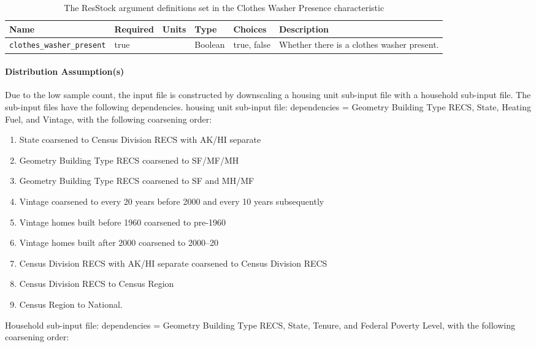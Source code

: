 \begin{longtable}[]{ |p{}|p{1.5cm}|p{1cm}|p{1.1cm}|p{3.4cm}|p{4cm}| }
\caption{The ResStock argument definitions set in the Clothes Washer Presence characteristic}\label{table:hc_arg_def_clothes_washer_presence}\\
\toprule\noalign{}
Name & Required & Units & Type & Choices & Description \\
\midrule\noalign{}
\endhead
\bottomrule\noalign{}
\endlastfoot
\texttt{clothes\_washer\_present} & true & & Boolean & true, false &
Whether there is a clothes washer present. \\
\end{longtable}

\paragraph{Distribution Assumption(s)}
Due to the low sample count, the input file is constructed by downscaling a housing unit sub-input file with a household sub-input file. The sub-input files have the following dependencies. housing unit sub-input file: dependencies = Geometry Building Type RECS, State, Heating Fuel, and Vintage, with the following coarsening order:
\begin{enumerate}
    \item State coarsened to Census Division RECS with AK/HI separate
    \item  Geometry Building Type RECS coarsened to SF/MF/MH
    \item  Geometry Building Type RECS coarsened to SF and MH/MF 
    \item  Vintage coarsened to every 20 years before 2000 and every 10 years subsequently
    \item Vintage homes built before 1960 coarsened to pre-1960 
    \item  Vintage homes built after 2000 coarsened to 2000--20
    \item Census Division RECS with AK/HI separate coarsened to Census Division RECS 
    \item Census Division RECS to Census Region
    \item Census Region to National. 
\end{enumerate}

Household sub-input file: dependencies = Geometry Building Type RECS, State, Tenure, and Federal Poverty Level, with the following coarsening order:

